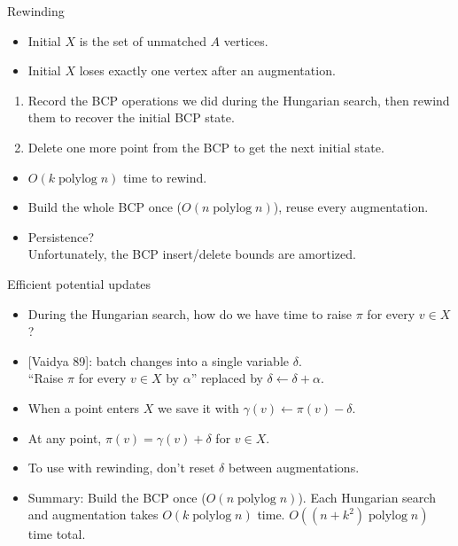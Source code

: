 \documentclass[xcolor={dvipsnames,usenames}]{beamer}
\DeclareMathOperator{\polylog}{polylog}
\begin{document}
\begin{frame}{Rewinding}
\begin{itemize}
\item Initial $X$ is the set of unmatched $A$ vertices.
\pause
\item Initial $X$ loses exactly one vertex after an augmentation.
\end{itemize}
\pause
\vspace{10pt}
\begin{enumerate}
\item Record the BCP operations we did during the Hungarian search, then
	\alert{rewind} them to recover the initial BCP state.
\pause
\item Delete one more point from the BCP to get the next initial state.
\end{enumerate}
\pause
\vspace{10pt}
\begin{itemize}
\item $O(k\polylog n)$ time to rewind.
\pause
\item Build the whole BCP once ($O(n\polylog n)$), reuse every augmentation.
\pause
\item Persistence?\\
\pause
Unfortunately, the BCP insert/delete bounds are amortized.
\end{itemize}
\end{frame}

\begin{frame}{Efficient potential updates}
\begin{itemize}
\item During the Hungarian search, how do we have time to raise $\pi$ for every $v \in X$?
\pause
\item {[Vaidya 89]}: batch changes into a single variable $\delta$.\\
	``Raise $\pi$ for every $v \in X$ by $\alpha$'' replaced by $\delta \gets \delta + \alpha$.
\vspace{10pt}
\pause
\item When a point enters $X$ we save it with $\gamma(v) \gets \pi(v) - \delta$.
\pause
\item At any point, $\pi(v) = \gamma(v) + \delta$ for $v \in X$.
\vspace{10pt}
\pause
\item To use with rewinding, don't reset $\delta$ between augmentations.
\vspace{10pt}
\pause
\item Summary: Build the BCP once ($O(n\polylog n)$).
	Each Hungarian search and augmentation takes $O(k\polylog n)$ time.
	$O((n+k^2)\polylog n)$ time total.
\end{itemize}

\end{frame}
\end{document}
